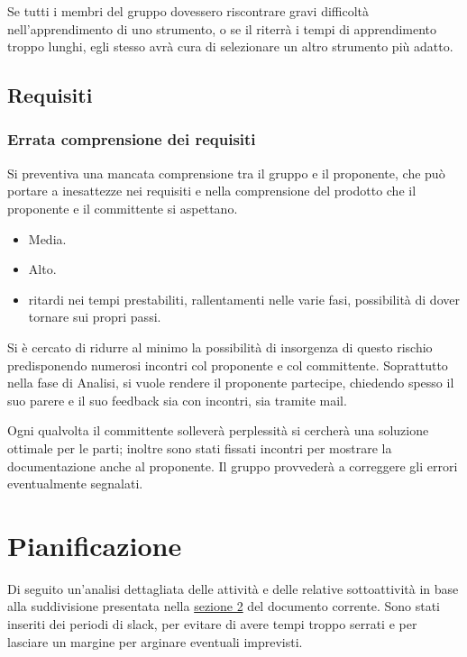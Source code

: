 \documentclass[a4paper, titlepage]{article}
\begin{document}
	Se tutti i membri del gruppo dovessero riscontrare gravi difficoltà nell'apprendimento di uno strumento, o se il  riterrà i tempi di apprendimento troppo lunghi, egli stesso avrà cura di selezionare un altro strumento più adatto.
	
	\subsection{Requisiti}
	\subsubsection{Errata comprensione dei requisiti}
	Si preventiva una mancata comprensione tra il gruppo e il proponente, che può portare a inesattezze nei requisiti e nella comprensione del prodotto che il proponente e il committente si aspettano.
	
	\begin{itemize}
		\item {} Media.
		\item {} Alto.
		\item {} ritardi nei tempi prestabiliti, rallentamenti nelle varie fasi, possibilità di dover tornare sui propri passi.
	\end{itemize}
	
	Si è cercato di ridurre al minimo la possibilità di insorgenza di questo rischio predisponendo numerosi incontri col proponente e col committente. Soprattutto nella fase di Analisi, si vuole rendere il proponente partecipe, chiedendo spesso il suo parere e il suo feedback sia con incontri, sia tramite mail.
	
	Ogni qualvolta il committente solleverà perplessità si cercherà una soluzione ottimale per le parti; inoltre sono stati fissati incontri per mostrare la documentazione anche al proponente. Il gruppo provvederà a correggere gli errori eventualmente segnalati.
	
	\newpage
	\section {Pianificazione}\label{Pianificazione}
	Di seguito un'analisi dettagliata delle attività e delle relative sottoattività in base alla suddivisione presentata nella \hyperref[Ciclo di vita]{sezione 2} del documento corrente.
	Sono stati inseriti dei periodi di slack, per evitare di avere tempi troppo serrati e per lasciare un margine per arginare eventuali imprevisti.
	
\end{document}
